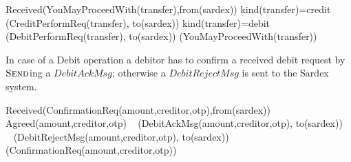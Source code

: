 \begin{asm}
\IF Received(YouMayProceedWith(transfer),from(sardex)) \THEN \+
\IF kind(transfer)=credit \THEN \+
   (CreditPerformReq(transfer), to(sardex)) \-
\IF kind(transfer)=debit \THEN \+
   (DebitPerformReq(transfer), to(sardex))  \-
(YouMayProceedWith(transfer))
\end{asm}

In case of a Debit operation a debitor has to confirm a received debit request by $\hbox{\sc Send}$ing a $DebitAckMsg$; otherwise a $DebitRejectMsg$ is sent to the Sardex system.
\begin{asm}
\IF Received(ConfirmationReq(amount,creditor,otp),from(sardex)) \THEN \+
   \IF Agreed(amount,creditor,otp)\+
       \THEN ~ (DebitAckMsg(amount,creditor,otp), to(sardex)) \\
       \ELSE ~ (DebitRejectMsg(amount,creditor,otp), to(sardex))\-
   (ConfirmationReq(amount,creditor,otp))
\end{asm}

 

















\def\note#1{}






